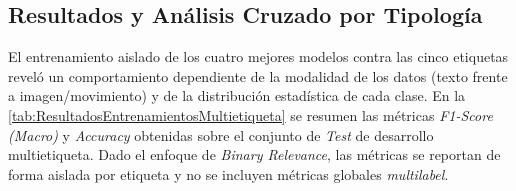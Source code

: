\subsection{Resultados y Análisis Cruzado por Tipología}
\label{subsec:ResultadosYAnalisisCruzadoPorTipologia}
El entrenamiento aislado de los cuatro mejores modelos contra las cinco etiquetas reveló un comportamiento dependiente de la modalidad de los datos (texto frente a imagen/movimiento) y de la distribución estadística de cada clase. En la \autoref{tab:ResultadosEntrenamientosMultietiqueta} se resumen las métricas \textit{F1-Score (Macro)} y \textit{Accuracy} obtenidas sobre el conjunto de \textit{Test} de desarrollo multietiqueta. Dado el enfoque de \textit{Binary Relevance}, las métricas se reportan de forma aislada por etiqueta y no se incluyen métricas globales \textit{multilabel}.

